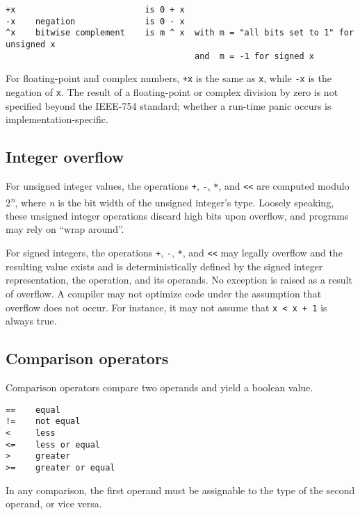 \begin{Verbatim}[frame=single]
+x                          is 0 + x
-x    negation              is 0 - x
^x    bitwise complement    is m ^ x  with m = "all bits set to 1" for unsigned x
                                      and  m = -1 for signed x
\end{Verbatim}

For floating-point and complex numbers, \texttt{+x} is the same as
\texttt{x}, while \texttt{-x} is the negation of \texttt{x}. The result
of a floating-point or complex division by zero is not specified beyond
the IEEE-754 standard; whether a run-time panic occurs is implementation-specific.

\subsection*{Integer overflow}

For unsigned integer values, the operations \texttt{+}, \texttt{-},
\texttt{*}, and \texttt{\textless{}\textless{}} are computed modulo
2\textsuperscript{\emph{n}}, where \emph{n} is the bit width of the
unsigned integer's type.  Loosely speaking, these unsigned integer
operations discard high bits upon overflow, and programs may rely
on ``wrap around''.

For signed integers, the operations \texttt{+}, \texttt{-}, \texttt{*},
and \texttt{\textless{}\textless{}} may legally overflow and the
resulting value exists and is deterministically defined by the signed
integer representation, the operation, and its operands. No exception is
raised as a result of overflow. A compiler may not optimize code under
the assumption that overflow does not occur. For instance, it may not
assume that \texttt{x \textless{} x + 1} is always true.

\subsection*{Comparison operators}

Comparison operators compare two operands and yield a boolean value.

\begin{Verbatim}[frame=single]
==    equal
!=    not equal
<     less
<=    less or equal
>     greater
>=    greater or equal
\end{Verbatim}

In any comparison, the first operand must be
assignable to the type of the second operand,
or vice versa.

